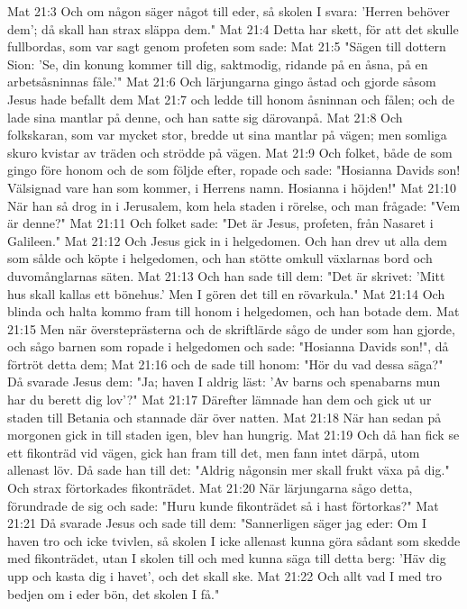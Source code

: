 Mat 21:3  Och om någon säger något till eder, så skolen I svara: 'Herren behöver dem'; då skall han strax släppa dem."
Mat 21:4  Detta har skett, för att det skulle fullbordas, som var sagt genom profeten som sade:
Mat 21:5  "Sägen till dottern Sion: 'Se, din konung kommer till dig, saktmodig, ridande på en åsna, på en arbetsåsninnas fåle.'"
Mat 21:6  Och lärjungarna gingo åstad och gjorde såsom Jesus hade befallt dem
Mat 21:7  och ledde till honom åsninnan och fålen; och de lade sina mantlar på denne, och han satte sig därovanpå.
Mat 21:8  Och folkskaran, som var mycket stor, bredde ut sina mantlar på vägen; men somliga skuro kvistar av träden och strödde på vägen.
Mat 21:9  Och folket, både de som gingo före honom och de som följde efter, ropade och sade: "Hosianna Davids son! Välsignad vare han som kommer, i Herrens namn. Hosianna i höjden!"
Mat 21:10  När han så drog in i Jerusalem, kom hela staden i rörelse, och man frågade: "Vem är denne?"
Mat 21:11  Och folket sade: "Det är Jesus, profeten, från Nasaret i Galileen."
Mat 21:12  Och Jesus gick in i helgedomen. Och han drev ut alla dem som sålde och köpte i helgedomen, och han stötte omkull växlarnas bord och duvomånglarnas säten.
Mat 21:13  Och han sade till dem: "Det är skrivet: 'Mitt hus skall kallas ett bönehus.' Men I gören det till en rövarkula."
Mat 21:14  Och blinda och halta kommo fram till honom i helgedomen, och han botade dem.
Mat 21:15  Men när översteprästerna och de skriftlärde sågo de under som han gjorde, och sågo barnen som ropade i helgedomen och sade: "Hosianna Davids son!", då förtröt detta dem;
Mat 21:16  och de sade till honom: "Hör du vad dessa säga?" Då svarade Jesus dem: "Ja; haven I aldrig läst: 'Av barns och spenabarns mun har du berett dig lov'?"
Mat 21:17  Därefter lämnade han dem och gick ut ur staden till Betania och stannade där över natten.
Mat 21:18  När han sedan på morgonen gick in till staden igen, blev han hungrig.
Mat 21:19  Och då han fick se ett fikonträd vid vägen, gick han fram till det, men fann intet därpå, utom allenast löv. Då sade han till det: "Aldrig någonsin mer skall frukt växa på dig." Och strax förtorkades fikonträdet.
Mat 21:20  När lärjungarna sågo detta, förundrade de sig och sade: "Huru kunde fikonträdet så i hast förtorkas?"
Mat 21:21  Då svarade Jesus och sade till dem: "Sannerligen säger jag eder: Om I haven tro och icke tvivlen, så skolen I icke allenast kunna göra sådant som skedde med fikonträdet, utan I skolen till och med kunna säga till detta berg: 'Häv dig upp och kasta dig i havet', och det skall ske.
Mat 21:22  Och allt vad I med tro bedjen om i eder bön, det skolen I få."

